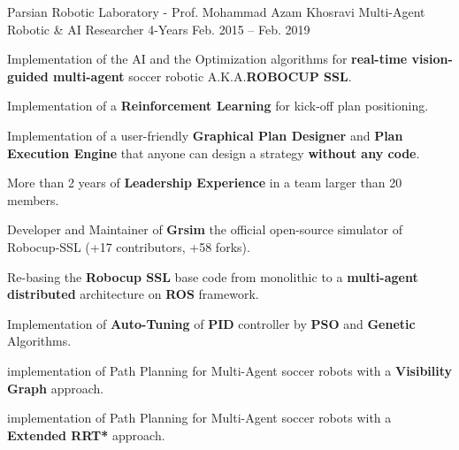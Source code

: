 

\begin{cventries}


  \cventry
    {Parsian Robotic Laboratory - Prof. Mohammad Azam Khosravi} %
    {Multi-Agent Robotic \& AI Researcher} %
    {4-Years} %
    {Feb. 2015 -- Feb. 2019} %
    {
      \begin{cvitems} %
        \item Implementation of the AI and the Optimization algorithms for \textbf{real-time vision-guided multi-agent} soccer robotic A.K.A.\textbf{ROBOCUP SSL}.
        \item Implementation of a \textbf{Reinforcement Learning} for kick-off plan positioning.
        \item Implementation of a user-friendly \textbf{Graphical Plan Designer} and \textbf{Plan Execution Engine} that anyone can design a strategy \textbf{without any code}.
        \item More than 2 years of \textbf{Leadership Experience} in a team larger than 20 members.
        \item Developer and Maintainer of \textbf{Grsim} the official open-source simulator of Robocup-SSL (+17 contributors, +58 forks).
        \item Re-basing the \textbf{Robocup SSL} base code from monolithic  to a \textbf{multi-agent distributed} architecture on \textbf{ROS} framework.
        \item Implementation of \textbf{Auto-Tuning} of \textbf{PID} controller by \textbf{PSO} and \textbf{Genetic} Algorithms.
        \item implementation of Path Planning for Multi-Agent soccer robots with a \textbf{Visibility Graph} approach.
        \item implementation of Path Planning for Multi-Agent soccer robots with a \textbf{Extended RRT*} approach.
      \end{cvitems}
    }




\end{cventries}
